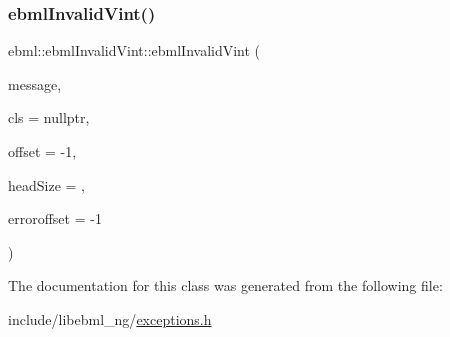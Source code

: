\subsubsection{\texorpdfstring{ebml\+Invalid\+Vint()}{ebmlInvalidVint()}}
{\footnotesize\ttfamily ebml\+::ebml\+Invalid\+Vint\+::ebml\+Invalid\+Vint (\begin{DoxyParamCaption}\item[{const std\+::string \&}]{message,  }\item[{const \mbox{\hyperlink{classebml_1_1ebmlElementClass}{ebml\+Element\+Class}} $\ast$}]{cls = {\ttfamily nullptr},  }\item[{off\+\_\+t}]{offset = {\ttfamily -\/1},  }\item[{unsigned char}]{head\+Size = {},  }\item[{off\+\_\+t}]{erroroffset = {\ttfamily -\/1} }\end{DoxyParamCaption})}



The documentation for this class was generated from the following file\+:\begin{DoxyCompactItemize}
\item 
include/libebml\+\_\+ng/\mbox{\hyperlink{exceptions_8h}{exceptions.\+h}}\end{DoxyCompactItemize}
